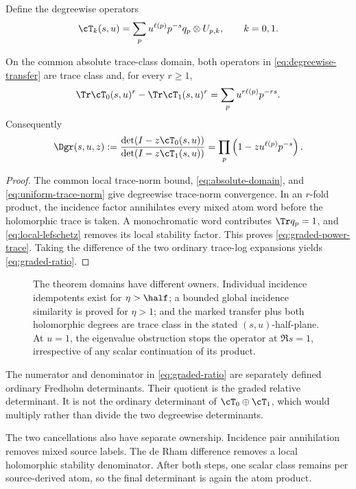 Define the degreewise operators
\begin{equation}
\cT_k(s,u)
=\sum_p u^{\ell(p)}p^{-s}q_p\otimes U_{p,k},
\qquad k=0,1.
\label{eq:degreewise-transfer}
\end{equation}

\begin{theorem}
\label{thm:graded-determinant}
On the common absolute trace-class domain, both operators in
\eqref{eq:degreewise-transfer} are trace class and, for every \(r\ge1\),
\begin{equation}
\Tr\cT_0(s,u)^r-\Tr\cT_1(s,u)^r
=\sum_p u^{r\ell(p)}p^{-rs}.
\label{eq:graded-power-trace}
\end{equation}
Consequently
\begin{equation}
\Dgr(s,u,z)
:=\frac{\det(I-z\cT_0(s,u))}
        {\det(I-z\cT_1(s,u))}
=\prod_p \left(1-zu^{\ell(p)}p^{-s}\right).
\label{eq:graded-ratio}
\end{equation}
\end{theorem}

\begin{proof}
The common local trace-norm bound, \eqref{eq:absolute-domain}, and
\eqref{eq:uniform-trace-norm} give degreewise trace-norm convergence. In an
\(r\)-fold product, the incidence factor annihilates every mixed atom word
before the holomorphic trace is taken. A monochromatic word contributes
\(\Tr q_p=1\), and \eqref{eq:local-lefschetz} removes its local stability
factor. This proves \eqref{eq:graded-power-trace}. Taking the difference of
the two ordinary trace-log expansions yields \eqref{eq:graded-ratio}.
\end{proof}

\begin{figure}[t]
\centering
\resizebox{0.94\textwidth}{!}{}
\caption{The theorem domains have different owners. Individual incidence
idempotents exist for \(\eta>\half\); a bounded global incidence similarity
is proved for \(\eta>1\); and the marked transfer plus both holomorphic
degrees are trace class in the stated \((s,u)\)-half-plane. At \(u=1\), the
eigenvalue obstruction stops the operator at \(\Re s=1\), irrespective of
any scalar continuation of its product.}
\label{fig:analytic-domains}
\end{figure}

\begin{remark}
\label{rem:ordinary-graded}
The numerator and denominator in \eqref{eq:graded-ratio} are separately
defined ordinary Fredholm determinants. Their quotient is the graded
relative determinant. It is not the ordinary determinant of
\(\cT_0\oplus\cT_1\), which would multiply rather than divide the two
degreewise determinants.
\end{remark}

The two cancellations also have separate ownership. Incidence pair
annihilation removes mixed source labels. The de Rham difference removes a
local holomorphic stability denominator. After both steps, one scalar class
remains per source-derived atom, so the final determinant is again the atom
product.
